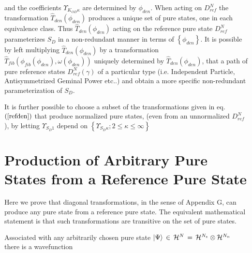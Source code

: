 and the coefficients $\Upsilon _{K_{OD}\kappa }$ are determined by $\phi
_{den}$. When acting on $D_{ref}^{N}$ the transformation $\hat{T}%
_{den}\left( \phi _{den}\right) $ produces a unique set of pure states, one
in each equivalence class. Thus $\hat{T}_{den}\left( \phi _{den}\right) $
acting on the reference pure state $D_{ref}^{N}$ parameterizes $S_{D}$ in a
non-redundant manner in terms of $\left\{ \phi _{den}\right\} $. It is
possible by left multiplying $\hat{T}_{den}\left( \phi _{den}\right) $ by a
transformation $\hat{T}_{fib}\left( \phi _{fib}\left( \phi _{den}\right)
,\omega \left( \phi _{den}\right) \right) $ uniquely determined by $\hat{T}%
_{den}\left( \phi _{den}\right) $, that a path of pure reference states $%
D_{ref}^{N}\left( \gamma \right) $ of a particular type (i.e. Independent
Particle, Antisymmetrized Geminal Power etc..) and obtain a more specific
non-redundant parameterization of $S_{D}$.

It is further possible to choose a subset of the transformations given in
eq. $\left( \ref{refden}\right) $ that produce normalized pure states, (even
from an unnormalized $D_{ref}^{N}$), by letting $\Upsilon _{S_{D}1}$ depend
on $\left\{ \Upsilon _{S_{D}\kappa };2\leq \kappa \leq \infty \right\} $

\section{Production of Arbitrary Pure States from a Reference Pure State}

\noindent Here we prove that diagonal transformations, in the sense of
Appendix G, can produce any pure state from a reference pure state. The
equivalent mathematical statement is that such transformations are
transitive on the set of pure states.

Associated with any arbitrarily chosen pure state $|\Psi \rangle \,\in \,%
{\cal H}^{N}\,=\,{\cal H}^{N_{e}}\otimes {\cal H}^{N_{n}}$ there is a
wavefunction %

